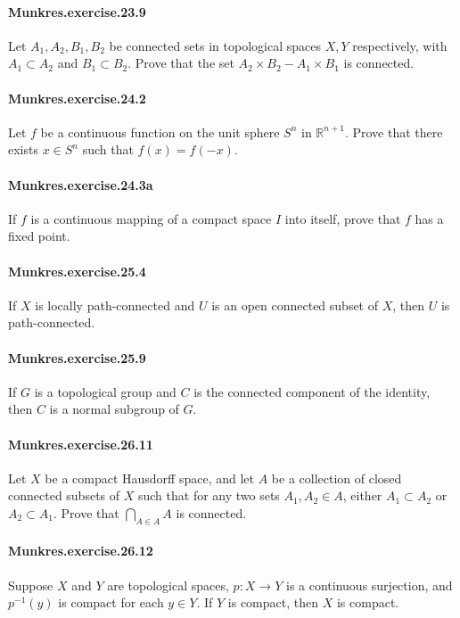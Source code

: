 \documentclass{article}
\begin{document}
\paragraph{Munkres.exercise.23.9} Let $A_1, A_2, B_1, B_2$ be connected sets in topological spaces $X, Y$ respectively, with $A_1\subset A_2$ and $B_1\subset B_2$. Prove that the set $A_2\times B_2 - A_1\times B_1$ is connected.

\paragraph{Munkres.exercise.24.2} Let $f$ be a continuous function on the unit sphere $S^n$ in $\mathbb{R}^{n+1}$. Prove that there exists $x\in S^n$ such that $f(x)=f(-x)$.

\paragraph{Munkres.exercise.24.3a} If $f$ is a continuous mapping of a compact space $I$ into itself, prove that $f$ has a fixed point.

\paragraph{Munkres.exercise.25.4} If $X$ is locally path-connected and $U$ is an open connected subset of $X$, then $U$ is path-connected.

\paragraph{Munkres.exercise.25.9} If $G$ is a topological group and $C$ is the connected component of the identity, then $C$ is a normal subgroup of $G$.

\paragraph{Munkres.exercise.26.11} Let $X$ be a compact Hausdorff space, and let $A$ be a collection of closed connected subsets of $X$ such that for any two sets $A_1, A_2 \in A$, either $A_1 \subset A_2$ or $A_2 \subset A_1$. Prove that $\bigcap_{A\in A} A$ is connected.

\paragraph{Munkres.exercise.26.12} Suppose $X$ and $Y$ are topological spaces, $p:X\to Y$ is a continuous surjection, and $p^{-1}(y)$ is compact for each $y\in Y$. If $Y$ is compact, then $X$ is compact.
\end{document}
